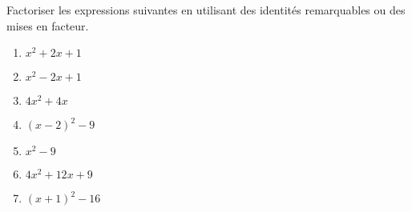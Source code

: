 
\begin{exercice}\label{exosmath-0047}

    Factoriser les expressions suivantes en utilisant des identités remarquables ou des mises en facteur.
    \begin{multicols}{3}
        \begin{enumerate}
            \item
                \( x^2+2x+1\)
            \item
                \( x^2-2x+1\)
            \item
                \( 4x^2+4x\)
            \item
                \( (x-2)^2-9\)
            \item
                \( x^2-9\)
            \item
                \( 4x^2+12x+9\)
            \item
                \( (x+1)^2-16\)
        \end{enumerate}
    \end{multicols}

\end{exercice}
